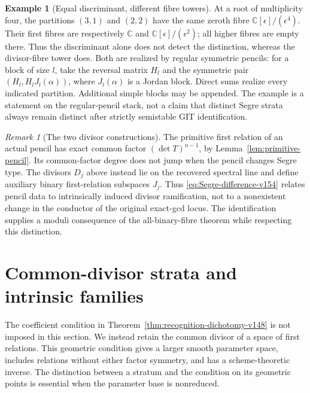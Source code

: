 \documentclass[11pt,reqno]{amsart}
\numberwithin{equation}{section}
\theoremstyle{definition}\newtheorem{definition}[theorem]{Definition}
\newtheorem{example}[theorem]{Example}
\theoremstyle{remark}\newtheorem{remark}[theorem]{Remark}
\newcommand{\C}{\mathbb C}\newcommand{\Q}{\mathbb Q}
\begin{document}
\begin{example}[Equal discriminant, different fibre towers]
\label{ex:segre-fibres-v154}
At a root of multiplicity four, the partitions $(3,1)$ and $(2,2)$
have the same zeroth fibre $\C[\epsilon]/(\epsilon^4)$.
Their first fibres are respectively $\C$ and
$\C[\epsilon]/(\epsilon^2)$; all higher fibres are empty there.
Thus the discriminant alone does not detect the distinction, whereas
the divisor-fibre tower does. Both are realized by regular symmetric
pencils: for a block of size $l$, take the reversal matrix $H_l$ and
the symmetric pair $(H_l,H_lJ_l(\alpha))$, where $J_l(\alpha)$ is
a Jordan block. Direct sums realize every indicated partition.
Additional simple blocks may be appended. The example is a statement
on the regular-pencil stack, not a claim that distinct Segre strata
always remain distinct after strictly semistable GIT identification.
\end{example}

\begin{remark}[The two divisor constructions]\label{rem:two-divisors-v154}
The primitive first relation of an actual pencil has exact common
factor $(\det T)^{n-1}$, by Lemma~\ref{lem:primitive-pencil}.
Its common-factor degree does not jump when the pencil changes
Segre type. The divisors $D_j$ above instead lie on the recovered
spectral line and define auxiliary binary first-relation subspaces
$J_j$. Thus \eqref{eq:Segre-difference-v154} relates pencil data to
intrinsically induced divisor ramification, not to a nonexistent
change in the conductor of the original exact-gcd locus. The
identification supplies a moduli consequence of the all-binary-fibre
theorem while respecting this distinction.
\end{remark}


\section{Common-divisor strata and intrinsic families}
\label{sec:common-divisor-strata}

The coefficient condition in Theorem~\ref{thm:recognition-dichotomy-v148}
is not imposed in this section.  We instead retain the common divisor
of a space of first relations.  This geometric condition gives a
larger smooth parameter space, includes relations without either
factor symmetry, and has a scheme-theoretic inverse.  The distinction
between a stratum and the condition on its geometric points is
essential when the parameter base is nonreduced.
\end{document}
